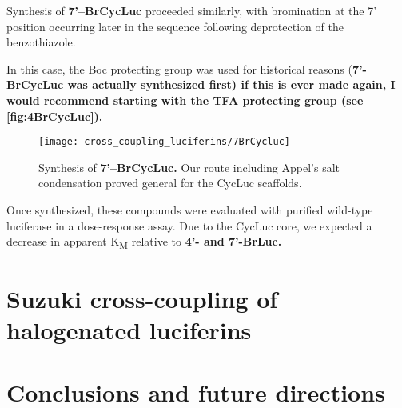 Synthesis of \textbf{7'--BrCycLuc} proceeded similarly, with bromination at the 7' position occurring later in the sequence following deprotection of the benzothiazole.
\begin{thoughts}
  In this case, the Boc protecting group was used for historical reasons (\bf{7'-BrCycLuc} was actually synthesized first) if this is ever made again, I would recommend starting with the TFA protecting group (see \autoref{fig:4BrCycLuc}).
\end{thoughts}

\begin{figure}[htbp]
\texttt{[image: cross\_coupling\_luciferins/7BrCycluc]} %
\centering
\caption[Synthesis of \textbf{7'--BrCycLuc.}]{
Synthesis of \textbf{7'--BrCycLuc.} Our route including Appel's salt condensation proved general for the CycLuc scaffolds.
}
  \label{fig:7BrCycLuc}
\end{figure}

Once synthesized, these compounds were evaluated with purified wild-type luciferase in a dose-response assay. Due to the CycLuc core, we expected a decrease in apparent K\textsubscript{M} relative to \bf{4'-} and \bf{7'-BrLuc}. 

\section{Suzuki cross-coupling of halogenated luciferins}

\section{Conclusions and future directions}




